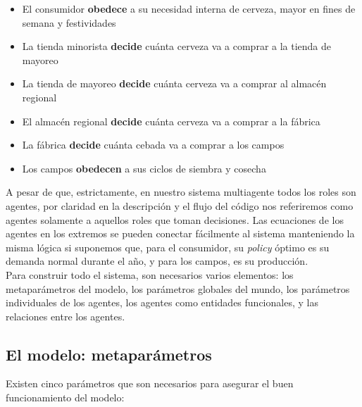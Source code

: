 \begin{itemize}
    \item El consumidor \textbf{obedece} a su necesidad interna de cerveza, mayor en fines de semana y festividades
    \item La tienda minorista \textbf{decide} cu\'anta cerveza va a comprar a la tienda de mayoreo
    \item La tienda de mayoreo \textbf{decide} cu\'anta cerveza va a comprar al almac\'en regional
    \item El almac\'en regional \textbf{decide} cu\'anta cerveza va a comprar a la f\'abrica
    \item La f\'abrica \textbf{decide} cu\'anta cebada va a comprar a los campos
    \item Los campos \textbf{obedecen} a sus ciclos de siembra y cosecha
\end{itemize}

A pesar de que, estrictamente, en nuestro sistema multiagente todos los roles son agentes, por claridad en la descripci\'on y el flujo del c\'odigo nos referiremos como agentes solamente a aquellos roles que toman decisiones. Las ecuaciones de los agentes en los extremos se pueden conectar f\'acilmente al sistema manteniendo la misma l\'ogica si suponemos que, para el consumidor, su \textit{policy} \'optimo es su demanda normal durante el a\~no, y para los campos, es su producci\'on.\\

Para construir todo el sistema, son necesarios varios elementos: los metapar\'ametros del modelo, los par\'ametros globales del mundo, los par\'ametros individuales de los agentes, los agentes como entidades funcionales, y las relaciones entre los agentes.\\

\subsection{El modelo: metapar\'ametros}

Existen cinco par\'ametros que son necesarios para asegurar el buen funcionamiento del modelo:

